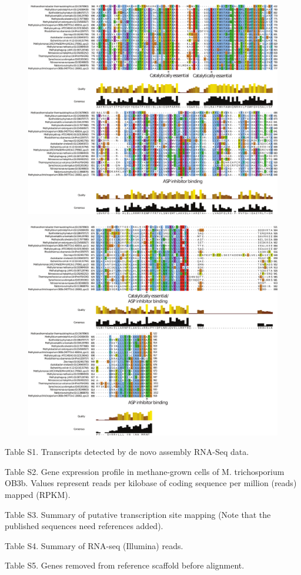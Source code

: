 \begin{figure}[H]
\centering
     \includegraphics[width=1.0\textwidth]{./tex/chapter1/figures/supplemental/FigureS6f.pdf}
\end{figure}


\begin{figure}[H]
\centering
     \includegraphics[width=1.0\textwidth]{./tex/chapter1/figures/supplemental/FigureS6g.pdf}
\end{figure}



Table S1. Transcripts detected by de novo assembly RNA-Seq data.

Table S2. Gene expression profile in methane-grown cells of M. trichosporium OB3b. Values represent reads per kilobase of coding sequence per million (reads) mapped (RPKM).

Table S3. Summary of putative transcription site mapping (Note that the published sequences need references added).

Table S4. Summary of RNA-seq (Illumina) reads.

Table S5. Genes removed from reference scaffold before alignment.



